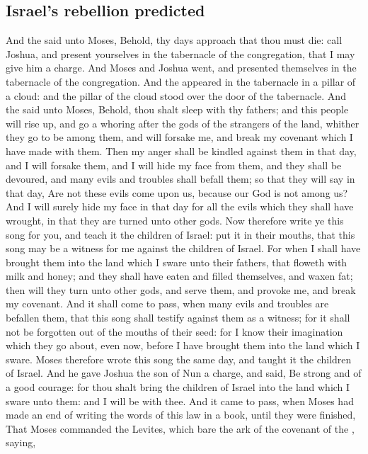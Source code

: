 \begin{biblechapter}
\section*{Israel's rebellion predicted}
\verse And the \LORD said unto Moses, Behold, thy days approach that thou must die: call Joshua, and present yourselves in the tabernacle of the congregation, that I may give him a charge. And Moses and Joshua went, and presented themselves in the tabernacle of the congregation.
\verse And the \LORD appeared in the tabernacle in a pillar of a cloud: and the pillar of the cloud stood over the door of the tabernacle.
\verse And the \LORD said unto Moses, Behold, thou shalt sleep with thy fathers; and this people will rise up, and go a whoring after the gods of the strangers of the land, whither they go to be among them, and will forsake me, and break my covenant which I have made with them.
\verse Then my anger shall be kindled against them in that day, and I will forsake them, and I will hide my face from them, and they shall be devoured, and many evils and troubles shall befall them; so that they will say in that day, Are not these evils come upon us, because our God is not among us?
\verse And I will surely hide my face in that day for all the evils which they shall have wrought, in that they are turned unto other gods.
\verse Now therefore write ye this song for you, and teach it the children of Israel: put it in their mouths, that this song may be a witness for me against the children of Israel.
\verse For when I shall have brought them into the land which I sware unto their fathers, that floweth with milk and honey; and they shall have eaten and filled themselves, and waxen fat; then will they turn unto other gods, and serve them, and provoke me, and break my covenant.
\verse And it shall come to pass, when many evils and troubles are befallen them, that this song shall testify against them as a witness; for it shall not be forgotten out of the mouths of their seed: for I know their imagination which they go about, even now, before I have brought them into the land which I sware.
\verse Moses therefore wrote this song the same day, and taught it the children of Israel.
\verse And he gave Joshua the son of Nun a charge, and said, Be strong and of a good courage: for thou shalt bring the children of Israel into the land which I sware unto them: and I will be with thee.
\verse And it came to pass, when Moses had made an end of writing the words of this law in a book, until they were finished,
\verse That Moses commanded the Levites, which bare the ark of the covenant of the \LORD, saying,

\end{biblechapter}
